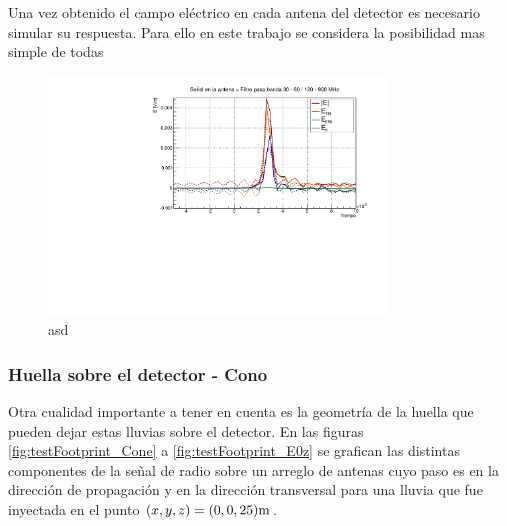 	Una vez obtenido el campo eléctrico en cada antena del detector es necesario simular su respuesta.
	Para ello en este trabajo se considera la posibilidad mas simple de todas
	
	
	\begin{figure}[ht!]
		\centering
		\includegraphics[width=0.8\textwidth]{./fig/simulacionRadio/antennaFilt}
		\caption{\label{fig:antHEnv}
		asd
		}
	\end{figure}
	
	
	
	\subsubsection{Huella sobre el detector - Cono \cher}
	
	Otra cualidad importante a tener en cuenta es la geometría de la huella que pueden dejar estas lluvias sobre el detector.
	En las figuras \ref{fig:testFootprint_Cone} a \ref{fig:testFootprint_E0z} se grafican las distintas componentes de la se\~nal de radio sobre un arreglo de antenas cuyo paso es  en la dirección de propagación y  en la dirección transversal para una lluvia que fue inyectada en el punto $(x,y,z)=(0,0,25){\rm m}$.
	
